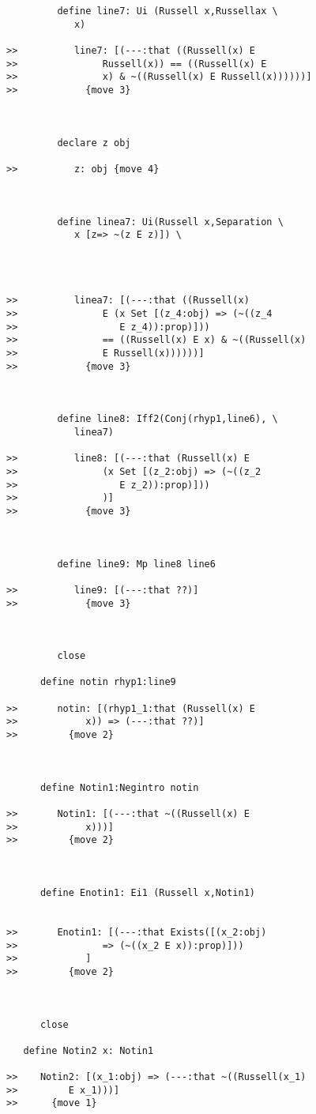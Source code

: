 \documentclass[12pt]{article}
\begin{document}
\begin{verbatim}
         define line7: Ui (Russell x,Russellax \
            x)

>>          line7: [(---:that ((Russell(x) E
>>               Russell(x)) == ((Russell(x) E
>>               x) & ~((Russell(x) E Russell(x))))))]
>>            {move 3}



         declare z obj

>>          z: obj {move 4}



         define linea7: Ui(Russell x,Separation \
            x [z=> ~(z E z)]) \
            



>>          linea7: [(---:that ((Russell(x)
>>               E (x Set [(z_4:obj) => (~((z_4
>>                  E z_4)):prop)]))
>>               == ((Russell(x) E x) & ~((Russell(x)
>>               E Russell(x))))))]
>>            {move 3}



         define line8: Iff2(Conj(rhyp1,line6), \
            linea7)

>>          line8: [(---:that (Russell(x) E
>>               (x Set [(z_2:obj) => (~((z_2
>>                  E z_2)):prop)]))
>>               )]
>>            {move 3}



         define line9: Mp line8 line6

>>          line9: [(---:that ??)]
>>            {move 3}



         close

      define notin rhyp1:line9

>>       notin: [(rhyp1_1:that (Russell(x) E
>>            x)) => (---:that ??)]
>>         {move 2}



      define Notin1:Negintro notin

>>       Notin1: [(---:that ~((Russell(x) E
>>            x)))]
>>         {move 2}



      define Enotin1: Ei1 (Russell x,Notin1)


>>       Enotin1: [(---:that Exists([(x_2:obj)
>>               => (~((x_2 E x)):prop)]))
>>            ]
>>         {move 2}



      close

   define Notin2 x: Notin1

>>    Notin2: [(x_1:obj) => (---:that ~((Russell(x_1)
>>         E x_1)))]
>>      {move 1}




\end{verbatim}
\end{document}
